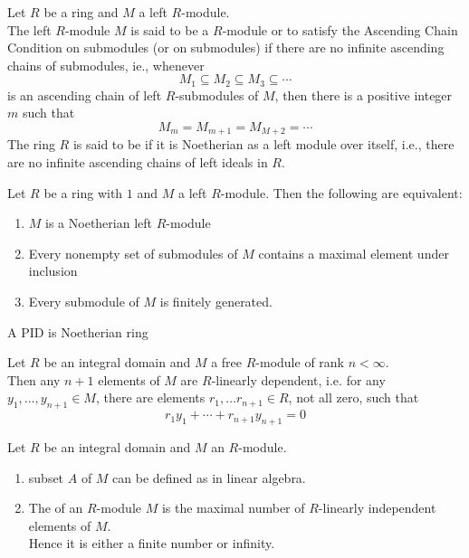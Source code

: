 \begin{definition}
Let $R$ be a ring and $M$ a left $R$-module. \\
The left $R$-module $M$ is said to be a  $R$-module or to satisfy the Ascending Chain Condition on submodules (or  on submodules) if there are no infinite ascending chains of submodules, ie., whenever
\begin{equation}
M_1 \subseteq M_2 \subseteq M_3 \subseteq \cdots \nonumber
\end{equation}
is an ascending chain of left $R$-submodules of $M$, then there is a positive integer $m$ such that
\begin{equation}
M_m = M_{m+1} = M_{M+2} = \cdots \nonumber
\end{equation}
The ring $R$ is said to be  if it is Noetherian as a left module over itself, i.e., there are no infinite ascending chains of left ideals in $R$.
\end{definition}

\begin{theorem}
Let $R$ be a ring with $1$ and $M$ a left $R$-module. Then the following are equivalent:
\begin{enumerate}[label=(\roman*)]
\item $M$ is a Noetherian left $R$-module
\item Every nonempty set of submodules of $M$ contains a maximal element under inclusion
\item Every submodule of $M$ is finitely generated.
\end{enumerate}
\end{theorem}

\begin{corollary}
A PID is Noetherian ring
\end{corollary}

\begin{proposition}
Let $R$ be an integral domain and $M$ a free $R$-module of rank $n < \infty$. \\
Then any $n+1$ elements of $M$ are $R$-linearly dependent, i.e. for any $y_1, \ldots, y_{n+1} \in M$, there are elements $r_1, \ldots r_{n+1} \in R$, not all zero, such that
\begin{equation}
r_1 y_1 + \cdots + r_{n+1} y_{n+1} = 0 \nonumber
\end{equation}
\end{proposition}

\begin{definition}
Let $R$ be an integral domain and $M$ an $R$-module.
\begin{enumerate}[label=(\roman*)]
\item {} subset $A$ of $M$ can be defined as in linear algebra.
\item The  of an $R$-module $M$ is the maximal number of $R$-linearly independent elements of $M$.\\
Hence it is either a finite number or infinity.
\end{enumerate}
\end{definition}

